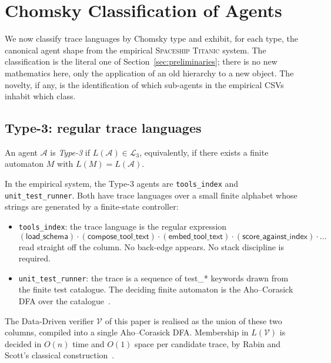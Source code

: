 \section{Chomsky Classification of Agents}
\label{sec:chomsky}

We now classify trace languages by Chomsky type and exhibit, for
each type, the canonical agent shape from the empirical
\textsc{Spaceship Titanic} system.  The classification is the
literal one of Section~\ref{sec:preliminaries}; there is no
new mathematics here, only the application of an old hierarchy to
a new object.  The novelty, if any, is the identification of
which sub-agents in the empirical CSVs inhabit which class.

\subsection{Type-3: regular trace languages}

\begin{definition}
\label{def:type3agent}
An agent $\mathcal{A}$ is \emph{Type-3} if $L(\mathcal{A}) \in
\mathcal{L}_3$, equivalently, if there exists a finite
automaton $M$ with $L(M) = L(\mathcal{A})$.
\end{definition}

In the empirical system, the Type-3 agents are
\texttt{tools\_index} and \texttt{unit\_test\_runner}.  Both have
trace languages over a small finite alphabet whose strings are
generated by a finite-state controller:
\begin{itemize}
\item \texttt{tools\_index}: the trace language is the regular
expression
\[
(\textsf{load\_schema})\cdot(\textsf{compose\_tool\_text})\cdot
(\textsf{embed\_tool\_text})\cdot(\textsf{score\_against\_index})
\cdot \dots
\]
read straight off the column.  No back-edge appears.  No stack
discipline is required.
\item \texttt{unit\_test\_runner}: the trace is a sequence of
\textsf{test\_*} keywords drawn from the finite test catalogue.
The deciding finite automaton is the Aho--Corasick DFA over the
catalogue~\cite{aho1975corasick}.
\end{itemize}

The Data-Driven verifier $\mathcal{V}$ of this paper is realised
as the union of these two columns, compiled into a single
Aho--Corasick DFA.  Membership in $L(\mathcal{V})$ is decided in
$O(n)$ time and $O(1)$ space per candidate trace, by Rabin and
Scott's classical
construction~\cite{rabin1959finite,aho1975corasick}.

